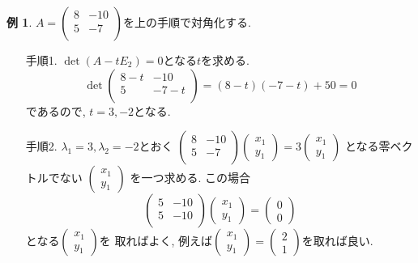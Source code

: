 \documentclass[dvipdfmx,a4paper,11pt]{article}
\theoremstyle{definition}
\newtheorem{exa}[thm]{例}
\begin{document}
\begin{exa}
$A=\begin{pmatrix}
8& -10 \\
5& -7 \\
\end{pmatrix}$を上の手順で対角化する.
\begin{enumerate}
	\setlength{\parskip}{0cm}
  	\setlength{\itemsep}{0pt} 
\item[手順1.] 
$\det (A - tE_2) =0$となる$t$を求める. 
$$
\det
\begin{pmatrix}
8-t& -10 \\
5& -7-t \\
\end{pmatrix}
= (8-t)(-7-t) + 50=0
$$
であるので, $t=3,-2$となる.
\item[手順2.] $\lambda_1=3, \lambda_2=-2$とおく
$
\begin{pmatrix}
8& -10 \\
5& -7 \\
\end{pmatrix}
\begin{pmatrix}
x_1 \\ y_1
 \end{pmatrix}  
 = 
3
 \begin{pmatrix}
x_1 \\ y_1
 \end{pmatrix}  
$
となる零ベクトルでない
$ \begin{pmatrix}
x_1 \\ y_1
 \end{pmatrix}  
 $
 を一つ求める. 
 この場合
 $$
 \begin{pmatrix}
5& -10 \\
5& -10 \\
\end{pmatrix}
\begin{pmatrix}
x_1 \\ y_1
 \end{pmatrix}  
 = 
 \begin{pmatrix}
0 \\ 0
 \end{pmatrix}  
 $$
 となる$ \begin{pmatrix}
x_1 \\ y_1
 \end{pmatrix}  
 $を
 取ればよく, 例えば$ \begin{pmatrix}
x_1 \\ y_1
 \end{pmatrix}  
 =
  \begin{pmatrix}
2 \\ 1
 \end{pmatrix}  
 $を取れば良い. 
 

\end{enumerate}
\end{exa}
\end{document}
